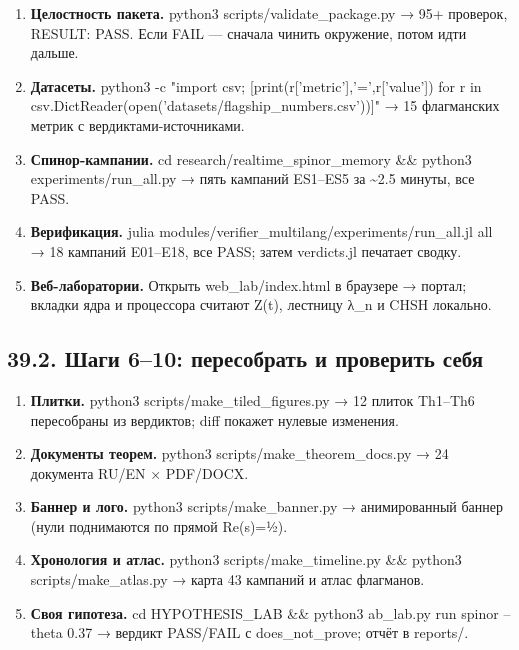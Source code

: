 \documentclass[11pt,a4paper]{article}
\begin{document}
\begin{enumerate}
  \item \textbf{Целостность пакета.} python3 scripts/validate\_package.py → 95+ проверок, RESULT: PASS. Если FAIL — сначала чинить окружение, потом идти дальше.
  \item \textbf{Датасеты.} python3 -c "import csv; [print(r['metric'],'=',r['value']) for r in csv.DictReader(open('datasets/flagship\_numbers.csv'))]" → 15 флагманских метрик с вердиктами-источниками.
  \item \textbf{Спинор-кампании.} cd research/realtime\_spinor\_memory \&\& python3 experiments/run\_all.py → пять кампаний ES1–ES5 за \textasciitilde{}2.5 минуты, все PASS.
  \item \textbf{Верификация.} julia modules/verifier\_multilang/experiments/run\_all.jl all → 18 кампаний E01–E18, все PASS; затем verdicts.jl печатает сводку.
  \item \textbf{Веб-лаборатории.} Открыть web\_lab/index.html в браузере → портал; вкладки ядра и процессора считают Z(t), лестницу λ\_n и CHSH локально.
\end{enumerate}

\subsection{39.2. Шаги 6–10: пересобрать и проверить себя}

\begin{enumerate}
  \item \textbf{Плитки.} python3 scripts/make\_tiled\_figures.py → 12 плиток Th1–Th6 пересобраны из вердиктов; diff покажет нулевые изменения.
  \item \textbf{Документы теорем.} python3 scripts/make\_theorem\_docs.py → 24 документа RU/EN × PDF/DOCX.
  \item \textbf{Баннер и лого.} python3 scripts/make\_banner.py → анимированный баннер (нули поднимаются по прямой Re(s)=½).
  \item \textbf{Хронология и атлас.} python3 scripts/make\_timeline.py \&\& python3 scripts/make\_atlas.py → карта 43 кампаний и атлас флагманов.
  \item \textbf{Своя гипотеза.} cd HYPOTHESIS\_LAB \&\& python3 ab\_lab.py run spinor --theta 0.37 → вердикт PASS/FAIL с does\_not\_prove; отчёт в reports/.
\end{enumerate}

\begin{center}\end{center}
\end{document}
